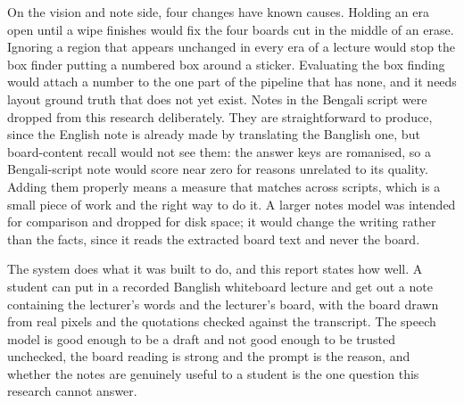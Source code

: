 On the vision and note side, four changes have known causes. Holding an era open until a
wipe finishes would fix the four boards cut in the middle of an erase. Ignoring a region
that appears unchanged in every era of a lecture would stop the box finder putting a
numbered box around a sticker. Evaluating the box finding would attach a number to the one
part of the pipeline that has none, and it needs layout ground truth that does not yet
exist. Notes in the Bengali script were dropped from this research deliberately. They are
straightforward to produce, since the English note is already made by translating the
Banglish one, but board-content recall would not see them: the answer keys are romanised,
so a Bengali-script note would score near zero for reasons unrelated to its quality.
Adding them properly means a measure that matches across scripts, which is a small piece
of work and the right way to do it. A larger notes model was intended for comparison and dropped for disk space;
it would change the writing rather than the facts, since it reads the extracted board text
and never the board.

The system does what it was built to do, and this report states how well. A student can
put in a recorded Banglish whiteboard lecture and get out a note containing the lecturer's
words and the lecturer's board, with the board drawn from real pixels and the quotations
checked against the transcript. The speech model is good enough to be a draft and not good
enough to be trusted unchecked, the board reading is strong and the prompt is the reason,
and whether the notes are genuinely useful to a student is the one question this research
cannot answer.
